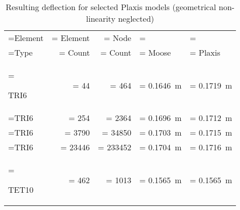 \begin{table}[htbp]
    \centering
    \caption{Resulting deflection for selected Plaxis models (geometrical non-linearity neglected)}
    \label{bended-plate:tab:results}
    \begin{tabularx}{\textwidth}{
            >{\hsize\linewidth=\hsize}X
            >{\hsize\linewidth=\hsize}R
            >{\hsize\linewidth=\hsize}R
            >{\hsize\linewidth=\hsize}Y
            >{\hsize\linewidth=\hsize}Y}

        \hline


        Element & Element        & Node           &                                                                                                 \\

        Type    & Count          & Count          & Moose                                      & Plaxis               \\

        \hline

        TRI6    & \qty{44}{}     & \qty{464}{}    & \qty{0.1646}{\metre}                       & \qty{0.1719}{\metre}
        \\

        TRI6    & \qty{254}{}    & \qty{2364}{}   & \qty{0.1696}{\metre}                       & \qty{0.1712}{\metre}
        \\ %

        TRI6    & \qty{3790}{}   & \qty{34850}{}  & \qty{0.1703}{\metre}                       &
        \qty{0.1715}{\metre}                                                                                          \\ %

        TRI6    & \qty{23446}{}  & \qty{233452}{} & \qty{0.1704}{\metre}                       &
        \qty{0.1716}{\metre}                                                                                          \\ %

        \hline

        TET10   & \qty{462}{}    & \qty{1013}{}   & \qty{0.1565}{\metre}                       &
        \qty{0.1565}{\metre}                                                                                          \\


\end{tabularx}
\end{table}
